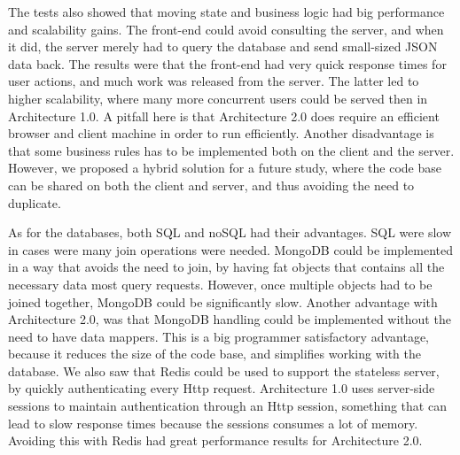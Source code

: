 The tests also showed that moving state and business logic had big performance and scalability gains. The front-end could avoid consulting the server, and when it did, the server merely had to query the database and send small-sized JSON data back. The results were that the front-end had very quick response times for user actions, and  much work was released from the server. The latter led to higher scalability, where many more concurrent users could be served then in Architecture 1.0. A pitfall here is that Architecture 2.0 does require an efficient browser and client machine in order to run efficiently. Another disadvantage is that some business rules has to be implemented both on the client and the server. However, we proposed a hybrid solution for a future study, where the code base can be shared on both the client and server, and thus avoiding the need to duplicate. 

As for the databases, both SQL and noSQL had their advantages. SQL were slow in cases were many join operations were needed. MongoDB could be implemented in a way that avoids the need to join, by having fat objects that contains all the necessary data most query requests. However, once multiple objects had to be joined together, MongoDB could be significantly slow. Another advantage with Architecture 2.0, was that MongoDB handling could be implemented without the need to have data mappers. This is a big programmer satisfactory advantage, because it reduces the size of the code base, and simplifies working with the database. We also saw that Redis could be used to support the stateless server, by quickly authenticating every Http request. Architecture 1.0 uses server-side sessions to maintain authentication through an Http session, something that can lead to slow response times because the sessions consumes a lot of memory. Avoiding this with Redis had great performance results for Architecture 2.0. 


